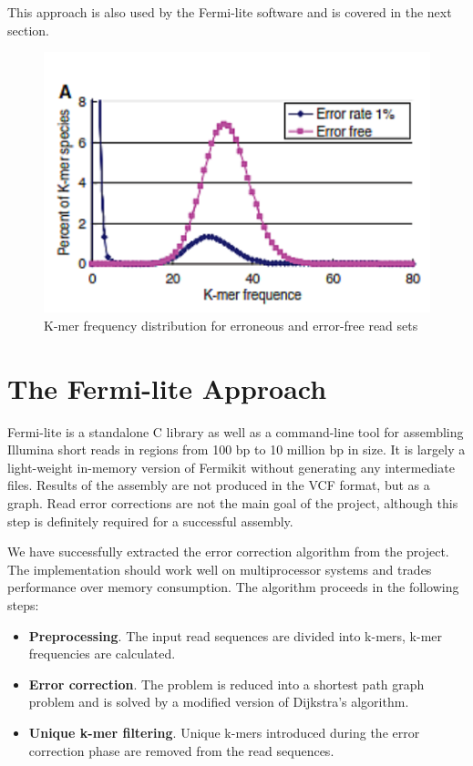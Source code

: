 This approach is also used by the Fermi-lite\cite{fermi-lite} software and is covered in the next section.

\begin{figure}[h]
	\centering
	\includegraphics{img/kmer-frequency-distribution.pdf}
	\caption{K-mer frequency distribution for erroneous and error-free read sets\cite{alg-compare}}
	\label{fig:kmer-frequency-distribution}
\end{figure}

\section{The Fermi-lite Approach}
\label{sec:fermi-lite}

Fermi-lite is a standalone C library as well as a command-line tool for assembling Illumina short reads in regions from 100 bp to 10 million bp in size. It is largely a light-weight in-memory version of Fermikit\cite{fermikit} without generating any intermediate files\cite{fermi-lite}. Results of the assembly are not produced in the VCF format, but as a graph. Read error corrections are not the main goal of the project, although this step is definitely required for a successful assembly.

We have successfully extracted the error correction algorithm from the project. The implementation should work well on multiprocessor systems and trades performance over memory consumption. The algorithm proceeds in the following steps:
\begin{itemize}
\item \textbf{Preprocessing}. The input read sequences are divided into k-mers, k-mer frequencies are calculated.
\item \textbf{Error correction}. The problem is reduced into a shortest path graph problem and is solved by a modified version of Dijkstra's algorithm.
\item \textbf{Unique k-mer filtering}. Unique k-mers introduced during the error correction phase are removed from the read sequences.
\end{itemize}
 
